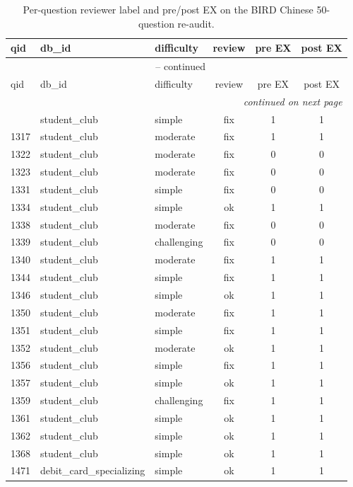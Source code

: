 \documentclass[11pt]{article}
\begin{document}
\begin{longtable}{lllccc}
\caption{Per-question reviewer label and pre/post EX on the BIRD Chinese 50-question re-audit.}
\label{tab:crosslingual-per-question} \\
\toprule
qid & db\_id & difficulty & review & pre EX & post EX \\
\midrule
\endfirsthead
\multicolumn{6}{c}{\tablename\ \thetable{} -- continued} \\
\toprule
qid & db\_id & difficulty & review & pre EX & post EX \\
\midrule
\endhead
\midrule
\multicolumn{6}{r}{\emph{continued on next page}} \\
\endfoot
\bottomrule
\endlastfoot
1312 & student\_club & simple & fix & 1 & 1 \\
1317 & student\_club & moderate & fix & 1 & 1 \\
1322 & student\_club & moderate & fix & 0 & 0 \\
1323 & student\_club & moderate & fix & 0 & 0 \\
1331 & student\_club & simple & fix & 0 & 0 \\
1334 & student\_club & simple & ok & 1 & 1 \\
1338 & student\_club & moderate & fix & 0 & 0 \\
1339 & student\_club & challenging & fix & 0 & 0 \\
1340 & student\_club & moderate & fix & 1 & 1 \\
1344 & student\_club & simple & fix & 1 & 1 \\
1346 & student\_club & simple & ok & 1 & 1 \\
1350 & student\_club & moderate & fix & 1 & 1 \\
1351 & student\_club & simple & fix & 1 & 1 \\
1352 & student\_club & moderate & ok & 1 & 1 \\
1356 & student\_club & simple & fix & 1 & 1 \\
1357 & student\_club & simple & ok & 1 & 1 \\
1359 & student\_club & challenging & fix & 1 & 1 \\
1361 & student\_club & simple & ok & 1 & 1 \\
1362 & student\_club & simple & ok & 1 & 1 \\
1368 & student\_club & simple & ok & 1 & 1 \\
1471 & debit\_card\_specializing & simple & ok & 1 & 1 \\

\end{longtable}
\end{document}
